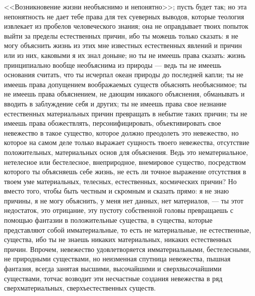 \documentclass[12pt]{article}
\begin{document}
<<Возникновение жизни необъяснимо и непонятно>>; пусть будет так; но эта непонятность не дает тебе права для тех суеверных выводов, которые теология извлекает из пробелов человеческого знания; она не оправдывает твоих попыток выйти за пределы естественных причин, ибо ты можешь только сказать: я не могу объяснить жизнь из этих мне известных естественных явлений и причин или из них, каковыми я их знал доныне; но ты не имеешь права сказать: жизнь принципиально вообще необъяснима из природы --- ведь ты не имеешь основания считать, что ты исчерпал океан природы до последней капли; ты не имеешь права допущением воображаемых существ объяснять необъяснимое; ты не имеешь права объяснением, не дающим никакого объяснения, обманывать и вводить в заблуждение себя и других; ты не имеешь права свое незнание естественных материальных причин превращать в небытие таких причин; ты не имеешь права обожествлять, персонифицировать, объективировать свое невежество в такое существо, которое должно преодолеть это невежество, но которое на самом деле только выражает сущность твоего невежества, отсутствие положительных, материальных основ для объяснения. Ведь это нематериальное, нетелесное или бестелесное, внеприродное, внемировое существо, посредством которого ты объясняешь себе жизнь, не есть ли точное выражение отсутствия в твоем уме материальных, телесных, естественных, космических причин? Но вместо того, чтобы быть честным и скромным и сказать прямо: я не знаю причины, я не могу объяснить, у меня нет данных, нет материалов, --- ты этот недостаток, это отрицание, эту пустоту собственной головы превращаешь с помощью фантазии в положительные существа, в существа, которые представляют собой имматериальные, то есть не материальные, не естественные, существа, ибо ты не знаешь никаких материальных, никаких естественных причин. Впрочем, невежество удовлетворяется имматериальными, бестелесными, не природными существами, но неизменная спутница невежества, пышная фантазия, всегда занятая высшими, высочайшими и сверхвысочайшими существами, тотчас возводит эти несчастные создания невежества в ряд сверхматериальных, сверхъестественных существ.

\section{}
\end{document}
